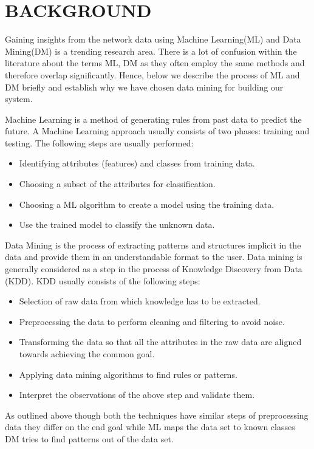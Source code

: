 
\chapter{BACKGROUND}

Gaining insights from the network data using Machine Learning(ML) and Data Mining(DM) is a trending research area. There is a lot of confusion within the literature about the terms ML, DM as they often employ the same methods and therefore overlap significantly. Hence, below we describe the process of ML and DM briefly and establish why we have chosen data mining for building our system.

Machine Learning is a method of generating rules from past data to predict the future.
A Machine Learning approach usually consists of two phases:
training and testing. The following steps are usually performed:
\begin{itemize}
	\item Identifying attributes (features) and classes from training data.
	\item Choosing a subset of the attributes for classification.
	\item Choosing a ML algorithm to create a model using the training data.
	\item Use the trained model to classify the unknown data.
\end{itemize}	

Data Mining is the process of extracting patterns and structures implicit in the data and provide them in an understandable format to the user. Data mining is generally considered as a step in the process of Knowledge Discovery from Data (KDD). KDD usually consists of the following steps:
\begin{itemize}
	\item Selection of raw data from which knowledge has to be extracted.
	\item Preprocessing the data to perform cleaning and filtering to avoid noise.
	\item Transforming the data so that all the attributes in the raw data are aligned towards achieving the common goal. 
	\item Applying data mining algorithms to find rules or patterns.
	\item Interpret the observations of the above step and validate them.
	
\end{itemize}

As outlined above though both the techniques have similar steps of preprocessing data they differ on the end goal while ML maps the data set to known classes DM tries to find patterns out of the data set.

